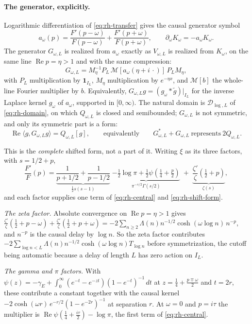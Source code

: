 \paragraph{The generator, explicitly.}
Logarithmic differentiation of \eqref{eq:rh-transfer} gives the causal
generator symbol
\[
a_\omega(p)=\frac{F'(p-\omega)}{F(p-\omega)}
+\frac{F'(p+\omega)}{F(p+\omega)},\qquad
\partial_\omega K_\omega=-a_\omega K_\omega .
\]
The generator $G_{\omega,L}$ is realized from $a_\omega$ exactly as
$V_{\omega,L}$ is realized from $K_\omega$, on the same line
$\operatorname{Re}p=\eta>1$ and with the same compression:
\[
G_{\omega,L}
=M_\eta^{-1}P_L\,\mathcal M[a_\omega(\eta+i\,\cdot)]\,P_LM_\eta ,
\]
with $P_L$ multiplication by $\mathbf1_{I_L}$, $M_\eta$ multiplication by
$e^{-\eta x}$, and $\mathcal M[b]$ the whole-line Fourier multiplier by $b$.
Equivalently, $G_{\omega,L}g=(g_\omega*\widetilde g)|_{I_L}$ for the inverse
Laplace kernel $g_\omega$ of $a_\omega$, supported in $[0,\infty)$. The natural
domain is $\mathcal D_{\log,L}$ of \eqref{eq:rh-domain}, on which
$Q_{\omega,L}$ is closed and semibounded; $G_{\omega,L}$ is not symmetric, and
only its symmetric part is a form:
\[
\operatorname{Re}\langle g,G_{\omega,L}g\rangle=Q_{\omega,L}[g],
\qquad\text{equivalently}\qquad
G_{\omega,L}^*+G_{\omega,L}\ \text{represents}\ 2Q_{\omega,L}.
\]

This is the \emph{complete} shifted form, not a part of it. Writing $\xi$ as its
three factors, with $s=1/2+p$,
\[
\frac{F'}{F}(p)=\underbrace{\frac1{p+1/2}+\frac1{p-1/2}}_{\frac12s(s-1)}
\;\underbrace{-\tfrac12\log\pi+\tfrac12\psi(\tfrac14+\tfrac p2)}
 _{\pi^{-s/2}\Gamma(s/2)}
\;+\;\underbrace{\frac{\zeta'}{\zeta}(\tfrac12+p)}_{\zeta(s)},
\]
and each factor supplies one term of \eqref{eq:rh-central} and
\eqref{eq:rh-shift-form}.

\emph{The zeta factor.} Absolute convergence on $\operatorname{Re}p=\eta>1$ gives
$\frac{\zeta'}{\zeta}(\frac12+p-\omega)+\frac{\zeta'}{\zeta}(\frac12+p+\omega)
=-2\sum_{n\geq2}\Lambda(n)n^{-1/2}\cosh(\omega\log n)\,n^{-p}$, and $n^{-p}$ is
the causal delay by $\log n$. So the zeta factor contributes
$-2\sum_{\log n<L}\Lambda(n)n^{-1/2}\cosh(\omega\log n)T_{\log n}$ before
symmetrization, the cutoff being automatic because a delay of length $L$ has
zero action on $I_L$.

\emph{The gamma and $\pi$ factors.} With
$\psi(z)=-\gamma_E+\int_0^\infty(e^{-t}-e^{-zt})(1-e^{-t})^{-1}\,dt$ at
$z=\frac14+\frac{p\mp\omega}2$ and $t=2r$, these contribute a constant together
with the causal kernel $-2\cosh(\omega r)\,e^{-r/2}(1-e^{-2r})^{-1}$ at
separation $r$. At $\omega=0$ and $p=i\tau$ the multiplier is
$\operatorname{Re}\psi(\frac14+\frac{i\tau}2)-\log\pi$, the first term of
\eqref{eq:rh-central}.

